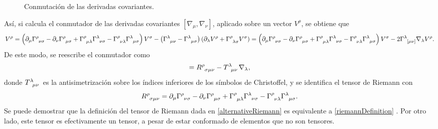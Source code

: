 \begin{figure}
\begin{center}
\end{center}

\caption{Conmutación de las derivadas covariantes.}
\label{fig:CovariantLoops}
\end{figure}
Así, si calcula el conmutador de las derivadas covariantes $[\nabla_\mu,\nabla_\nu]$, aplicado sobre un vector $V^\rho$, se obtiene que
\begin{dmath}
[\nabla_\mu,\nabla_\nu]V^\rho=\left(\partial_\mu \Gamma\indices{^\rho_{\nu\sigma}}-\partial_\nu \Gamma\indices{^\rho_{\mu\sigma}}+\Gamma\indices{^\rho_{\mu\lambda}}\Gamma\indices{^\lambda_{\nu\sigma}}-\Gamma\indices{^\rho_{\nu\lambda}}\Gamma\indices{^\lambda_{\mu\sigma}}\right)V^\sigma -\left(\Gamma\indices{^\lambda_{\mu\nu}}-\Gamma\indices{^\lambda_{\mu\sigma}}\right)\left(\partial_\lambda V^\rho+\Gamma\indices{^\rho_{\lambda\sigma}} V^\sigma\right) = \left(\partial_\mu \Gamma\indices{^\rho_{\nu\sigma}}-\partial_\nu \Gamma\indices{^\rho_{\mu\sigma}}+\Gamma\indices{^\rho_{\mu\lambda}}\Gamma\indices{^\lambda_{\nu\sigma}}-\Gamma\indices{^\rho_{\nu\lambda}}\Gamma\indices{^\lambda_{\mu\sigma}}\right)V^\sigma -2\Gamma\indices{^\lambda_{[\mu\nu]}}\nabla_\lambda V^\rho.
\end{dmath}
De este modo, se reescribe el conmutador como
\begin{equation}
[\nabla_\mu,\nabla_\nu]=R\indices{^\rho_{\sigma\mu\nu}}-T\indices{^\lambda_{\mu\nu}}\nabla_\lambda,
\end{equation}
donde $T\indices{^\lambda_{\mu\nu}}$ es la antisimetrización sobre los índices inferiores de los símbolos de Christoffel, y se identifica el tensor de Riemann con
\begin{equation}\label{riemannDefinition}
R\indices{^\rho_{\sigma\mu\nu}}=\partial_\mu \Gamma\indices{^\rho_{\nu\sigma}}-\partial_\nu \Gamma\indices{^\rho_{\mu\sigma}}+\Gamma\indices{^\rho_{\mu\lambda}}\Gamma\indices{^\lambda_{\nu\sigma}}-\Gamma\indices{^\rho_{\nu\lambda}}\Gamma\indices{^\lambda_{\mu\sigma}}.
\end{equation}
Se puede demostrar que la definición del tensor de Riemann dada en \eqref{alternativeRiemann} es equivalente a \eqref{riemannDefinition} \cite{wald_2010}. Por otro lado, este tensor es efectivamente un tensor, a pesar de estar conformado de elementos que no son tensores.

